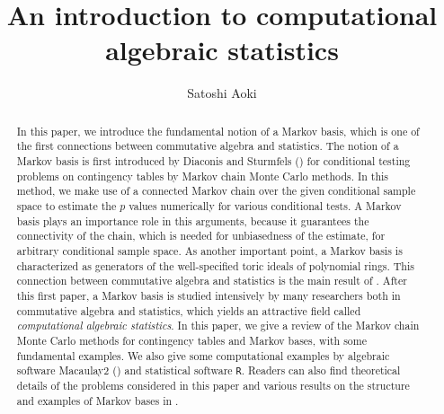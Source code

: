 \documentclass[12pt]{article}
\title{{\Large
An introduction to computational algebraic statistics
}}
\author{Satoshi Aoki}
\theoremstyle{definition}
\begin{document}
\maketitle

\begin{abstract}
In this paper, we introduce the fundamental notion of a Markov basis,
 which is one of the first connections between commutative algebra and
 statistics. The notion of a Markov basis is first introduced by Diaconis
 and Sturmfels (\cite{Diaconis-Sturmfels-1998}) for conditional testing
 problems on contingency tables by Markov chain Monte Carlo methods. In
 this method, we make use of a connected Markov
 chain over the given conditional sample space to 
 estimate the $p$ values numerically for various conditional tests. 
A Markov basis plays an importance role in this arguments, because it 
guarantees the connectivity of the chain, which is needed for
 unbiasedness of the estimate, for
 arbitrary conditional sample space. As another important point, 
a Markov basis is characterized as generators of
 the well-specified toric ideals of polynomial rings. 
This connection between commutative algebra and statistics is the main
 result of \cite{Diaconis-Sturmfels-1998}. After this first paper, 
a Markov basis is studied intensively by 
many researchers both in commutative algebra and statistics, which
 yields an attractive field called {\it computational algebraic
 statistics}. 
In this paper, we give a review of the Markov chain Monte
 Carlo methods for contingency tables and Markov bases, with some 
fundamental examples. We also give some computational examples by
 algebraic software Macaulay2
 (\cite{Macaulay2}) and statistical software \verb|R|.
Readers can also find theoretical details of the problems considered in
 this paper 
and various results on the structure and examples of Markov
 bases in \cite{Aoki-Hara-Takemura-2012}.
\end{abstract}
\end{document}
